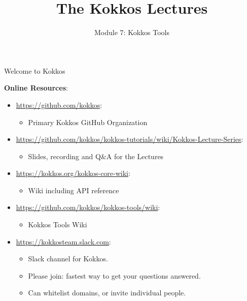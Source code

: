 
\def\sandid{SAND2020-9031 PE}

\title{The Kokkos Lectures}

\author{Module 7: Kokkos Tools}




\shortfalse
\mediumtrue
\fulltrue
\notoverviewtrue



\begin{frame}
  \titlepage
\end{frame}

\begin{frame}[fragile]{Welcome to Kokkos}

\textbf{Online Resources}:

\begin{itemize}
        \item \url{https://github.com/kokkos}:
                \begin{itemize}
                        \item Primary Kokkos GitHub Organization
                \end{itemize}
        \item \url{https://github.com/kokkos/kokkos-tutorials/wiki/Kokkos-Lecture-Series}:
                \begin{itemize}
      \item{Slides, recording and Q\&A for the Lectures}
                \end{itemize}
        \item \url{https://kokkos.org/kokkos-core-wiki}:
                \begin{itemize}
                        \item Wiki including API reference
                \end{itemize}
        \item \url{https://github.com/kokkos/kokkos-tools/wiki}:
                \begin{itemize}
                        \item Kokkos Tools Wiki
                \end{itemize}
        \item \url{https://kokkosteam.slack.com}:
                \begin{itemize}
                        \item Slack channel for Kokkos.
                        \item Please join: fastest way to get your questions answered.
                        \item Can whitelist domains, or invite individual people.
                \end{itemize}
\end{itemize}

\end{frame}


